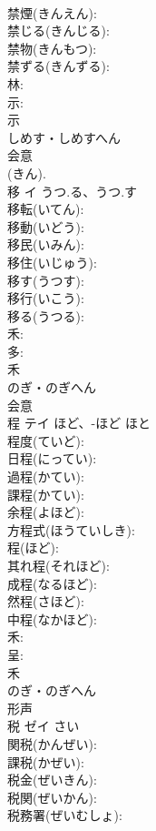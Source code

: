 \documentclass[8pt]{extreport}
\begin{document}
\begin{CJK}{UTF8}{min}
\\	禁煙(きんえん): 
\\	禁じる(きんじる): 
\\	禁物(きんもつ): 
\\	禁ずる(きんずる): 
\\	林: 
\\	示: 
\\	示	
\\	しめす・しめすへん	
\\	会意 
\\	(きん).
\\	移	イ	うつ.る、うつ.す		
\\	移転(いてん): 
\\	移動(いどう): 
\\	移民(いみん): 
\\	移住(いじゅう): 
\\	移す(うつす): 
\\	移行(いこう): 
\\	移る(うつる): 
\\	禾: 
\\	多: 
\\	禾	
\\	のぎ・のぎへん	
\\	会意 
\\	程	テイ	ほど、-ほど	ほと	
\\	程度(ていど): 
\\	日程(にってい): 
\\	過程(かてい): 
\\	課程(かてい): 
\\	余程(よほど): 
\\	方程式(ほうていしき): 
\\	程(ほど): 
\\	其れ程(それほど): 
\\	成程(なるほど): 
\\	然程(さほど): 
\\	中程(なかほど): 
\\	禾: 
\\	呈: 
\\	禾	
\\	のぎ・のぎへん	
\\	形声 
\\	税	ゼイ		さい	
\\	関税(かんぜい): 
\\	課税(かぜい): 
\\	税金(ぜいきん): 
\\	税関(ぜいかん): 
\\	税務署(ぜいむしょ): 

\end{CJK}
\end{document}
